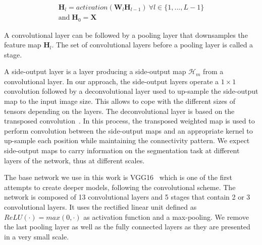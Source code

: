 \small
\begin{multline}
\mathbf{H}_l= activation(\mathbf{W}_l\mathbf{H}_{l-1})~\forall l \in \{1,...,L-1\} \\ \mbox{and} \; \mathbf{H}_0=\mathbf{X}
\end{multline}
\normalsize

A convolutional layer can be followed by a pooling layer that downsamples the feature map $\mathbf{H}_l$. The set of convolutional layers before a pooling layer is called a stage.


A side-output layer is a layer producing a side-output map $\mathcal{H}_m$ from a convolutional layer. In our approach, the side-output layers operate a $1 \times 1$ convolution followed by a deconvolutional layer used to up-sample the side-output map to the input image size. This allows to cope with the different sizes of tensors depending on the layers. The deconvolutional layer is based on the transposed convolution~\cite{dumoulin2016}. In this process, the transposed weighted map is used to perform convolution between the side-output maps and an appropriate kernel to up-sample each position while maintaining the connectivity pattern.
We expect side-output maps to carry information on the segmentation task at different layers of the network, thus at different scales.

The base network we use in this work is VGG16~\cite{simonyan2014} which is one of the first attempts to create deeper models, following the convolutional scheme. The network is composed of 13 convolutional layers and 5 stages that contain 2 or 3 convolutional layers. It uses the rectified linear unit defined as $ReLU(\cdot)=max(0,\cdot)$ as activation function and a max-pooling. We remove the last pooling layer as well as the fully connected layers as they are presented in a very small scale.

